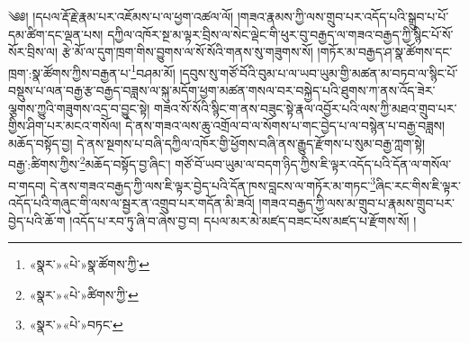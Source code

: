༄༅། །དཔལ་རྡོ་རྗེ་རྣམ་པར་འཇོམས་པ་ལ་ཕྱག་འཚལ་ལོ། །གཟའ་རྣམས་ཀྱི་ལས་གྲུབ་པར་འདོད་པའི་སྒྲུབ་པ་པོ་དམ་ཚིག་དང་ལྡན་པས། དཀྱིལ་འཁོར་སྔ་མ་ལྟར་བྲིས་ལ་སེང་ལྡེང་གི་ཕུར་བུ་བརྒྱད་ལ་གཟའ་བརྒྱད་ཀྱི་སྙིང་པོ་སོ་སོར་བྲིས་ལ། རྩེ་མོ་ལ་དུག་ཁྲག་གིས་བྱུགས་ལ་སོ་སོའི་གནས་སུ་གཟུགས་སོ། །གཏོར་མ་བརྒྱད་ཤ་སྣ་ཚོགས་དང་ཁྲག་:སྣ་ཚོགས་ཀྱིས་བརྒྱན་པ་\footnote{«སྣར་»«པེ་»སྣ་ཚོགས་ཀྱི་}བཤམ་མོ། །དབུས་སུ་གཙོ་བོའི་བུམ་པ་ལ་ཡབ་ཡུམ་གྱི་མཚན་མ་བཏབ་ལ་སྙིང་པོ་བསྡུས་པ་ལན་བརྒྱ་རྩ་བརྒྱད་བཟླས་ལ་སྐུ་མདོག་ཕྱག་མཚན་གསལ་བར་བསྐྱེད་པའི་ཐུགས་ཀ་ནས་འོད་ཟེར་ལྕགས་ཀྱུའི་གཟུགས་འདྲ་བ་བྱུང་སྟེ། གཟའ་སོ་སོའི་སྙིང་ག་ནས་བཟུང་སྟེ་རྣལ་འབྱོར་པའི་ལས་ཀྱི་མཐའ་གྲུབ་པར་གྱིས་ཤིག་པར་མངའ་གསོལ། དེ་ནས་གཟའ་ལས་ཆུ་འགྲོལ་བ་ལ་སོགས་པ་གང་བྱེད་པ་ལ་བསྙེན་པ་བརྒྱ་བཟླས། མཆོད་བསྟོད་བྱ། དེ་ནས་སྔགས་པ་བཞི་དཀྱིལ་འཁོར་གྱི་ཕྱོགས་བཞི་ནས་རྒྱུད་རྫོགས་པ་སུམ་བརྒྱ་ཀླག་སྟེ། བརྒྱ་:ཚིགས་ཀྱིས་\footnote{«སྣར་»«པེ་»ཚིགས་ཀྱི་}མཆོད་བསྟོད་བྱ་ཞིང་། གཙོ་བོ་ཡབ་ཡུམ་ལ་བདག་ཉིད་ཀྱིས་ཇི་ལྟར་འདོད་པའི་དོན་ལ་གསོལ་བ་གདབ། དེ་ནས་གཟའ་བརྒྱད་ཀྱི་ལས་ཇི་ལྟར་བྱེད་པའི་དོན་ཁས་བླངས་ལ་གཏོར་མ་གཏང་\footnote{«སྣར་»«པེ་»བཏང་}ཞིང་རང་གིས་ཇི་ལྟར་འདོད་པའི་གཞུང་གི་ལས་ལ་སྦྱར་ན་འགྲུབ་པར་གདོན་མི་ཟའོ། །གཟའ་བརྒྱད་ཀྱི་ལས་མ་གྲུབ་པ་རྣམས་གྲུབ་པར་བྱེད་པའི་ཆོ་ག །འདོད་པ་རབ་ཏུ་ཞི་བ་ཞེས་བྱ་བ། དཔལ་མར་མེ་མཛད་བཟང་པོས་མཛད་པ་རྫོགས་སོ། ། 
